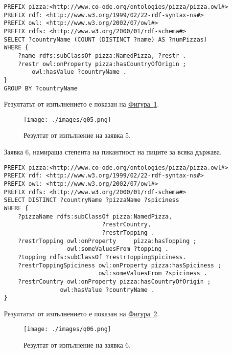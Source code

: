 \documentclass[12pt]{article}
\begin{document}
        \begin{lstlisting}[language=SPARQL,style=sparql]
PREFIX pizza:<http://www.co-ode.org/ontologies/pizza/pizza.owl#>
PREFIX rdf: <http://www.w3.org/1999/02/22-rdf-syntax-ns#>
PREFIX owl: <http://www.w3.org/2002/07/owl#>
PREFIX rdfs: <http://www.w3.org/2000/01/rdf-schema#>
SELECT ?countryName (COUNT (DISTINCT ?name) AS ?numPizzas)
WHERE {
    ?name rdfs:subClassOf pizza:NamedPizza, ?restr .
    ?restr owl:onProperty pizza:hasCountryOfOrigin ;
        owl:hasValue ?countryName .
}
GROUP BY ?countryName\end{lstlisting}

        Резултатът от изпълнението е показан на \hyperref[fig:q05]{Фигура~\ref*{fig:q05}}.

        \begin{center}
            \begin{figure}
            \centering
                \texttt{[image: ./images/q05.png]}
                \caption{Резултат от изпълнение на заявка 5.}
                \label{fig:q05}
            \end{figure}
        \end{center}
    
\clearpage
\pagebreak

        Заявка 6, намираща степента на пикантност на пиците за всяка държава.
        
        \begin{lstlisting}[language=SPARQL,style=sparql]
PREFIX pizza:<http://www.co-ode.org/ontologies/pizza/pizza.owl#>
PREFIX rdf: <http://www.w3.org/1999/02/22-rdf-syntax-ns#>
PREFIX owl: <http://www.w3.org/2002/07/owl#>
PREFIX rdfs: <http://www.w3.org/2000/01/rdf-schema#>
SELECT DISTINCT ?countryName ?pizzaName ?spiciness
WHERE {
    ?pizzaName rdfs:subClassOf pizza:NamedPizza,
                            ?restrCountry,
                            ?restrTopping .
    ?restrTopping owl:onProperty     pizza:hasTopping ;
                  owl:someValuesFrom ?topping .
    ?topping rdfs:subClassOf ?restrToppingSpiciness.
    ?restrToppingSpiciness owl:onProperty pizza:hasSpiciness ;
                           owl:someValuesFrom ?spiciness .
    ?restrCountry owl:onProperty pizza:hasCountryOfOrigin ;
                owl:hasValue ?countryName .
}\end{lstlisting}

        Резултатът от изпълнението е показан на \hyperref[fig:q06]{Фигура~\ref*{fig:q06}}.

        \begin{center}
            \begin{figure}
            \centering
                \texttt{[image: ./images/q06.png]}
                \caption{Резултат от изпълнение на заявка 6.}
                \label{fig:q06}
            \end{figure}
        \end{center}
    
\end{document}
